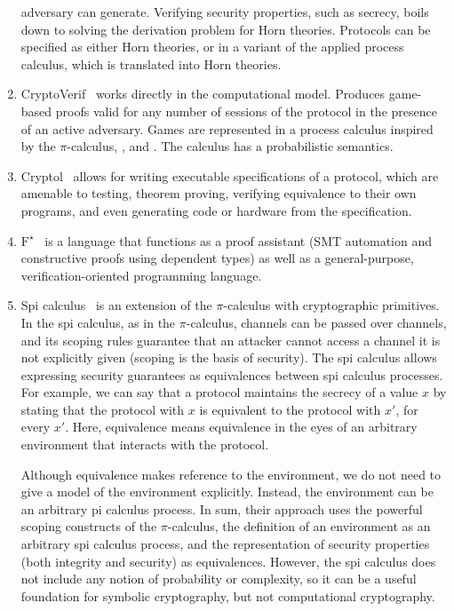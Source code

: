 \begin{enumerate}[leftmargin=*]
    adversary can generate. Verifying security properties, such as secrecy,
    boils down to solving the derivation problem for Horn theories. Protocols
    can be specified as either Horn theories, or in a variant of the applied
    process calculus, which is translated into Horn theories.
  \item CryptoVerif~\cite{blanchet2007cryptoverif} works directly in the
    computational model. Produces game-based proofs valid for any number of
    sessions of the protocol in the presence of an active adversary. Games are
    represented in a process calculus inspired by the $\pi$-calculus,
    \cite{laud2005secrecy}, and \cite{mitchell2006probabilistic}. The calculus
    has a probabilistic semantics.
  \item Cryptol~\cite{lewis2003cryptol} allows for writing executable
    specifications of a protocol, which are amenable to testing, theorem
    proving, verifying equivalence to their own programs, and even generating
    code or hardware from the specification.
  \item $\text{F}^{\star}$~\cite{swamy2016dependent} is a language that functions as
    a proof assistant (SMT automation and constructive proofs using dependent
    types) as well as a general-purpose, verification-oriented programming
    language.
  \item Spi calculus~\cite{abadi1999calculus} is an extension of the
    $\pi$-calculus with cryptographic primitives. In the spi calculus, as in the
    $\pi$-calculus, channels can be passed over channels, and its scoping rules
    guarantee that an attacker cannot access a channel it is not explicitly
    given (scoping is the basis of security). The spi calculus allows expressing
    security guarantees as equivalences between spi calculus processes. For
    example, we can say that a protocol maintains the secrecy of a value $x$ by
    stating that the protocol with $x$ is equivalent to the protocol with $x'$,
    for every $x'$. Here, equivalence means equivalence in the eyes of an
    arbitrary environment that interacts with the protocol. 

    Although equivalence makes reference to the environment, we do not need to
    give a model of the environment explicitly. Instead, the environment can be
    an arbitrary pi calculus process. In sum, their approach uses the powerful
    scoping constructs of the $\pi$-calculus, the definition of an environment as
    an arbitrary spi calculus process, and the representation of security
    properties (both integrity and security) as equivalences. However, the spi
    calculus does not include any notion of probability or complexity, so it can
    be a useful foundation for symbolic cryptography, but not computational
    cryptography.


\end{enumerate}
